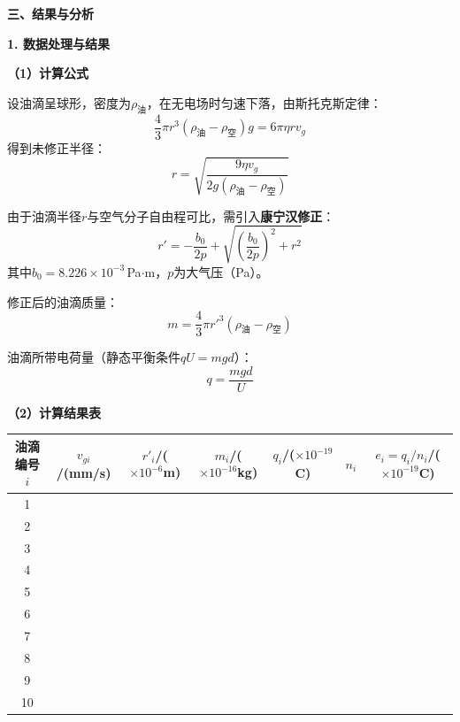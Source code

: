 \documentclass[a4paper,12pt]{article}
\begin{document}
\newpage

{\fontsize{16pt}{24pt}\selectfont \textbf{三、结果与分析}}

\vspace{0.5cm}

{\fontsize{14pt}{20pt}\selectfont \textbf{1. 数据处理与结果}}

\vspace{0.3cm}

{\fontsize{12pt}{18pt}\selectfont

\textbf{（1）计算公式}

设油滴呈球形，密度为$\rho_{\text{油}}$，在无电场时匀速下落，由斯托克斯定律：
\begin{equation}
    \frac{4}{3}\pi r^3(\rho_{\text{油}} - \rho_{\text{空}})g = 6\pi\eta r v_g
\end{equation}
得到未修正半径：
\begin{equation}
    r = \sqrt{\frac{9\eta v_g}{2g(\rho_{\text{油}} - \rho_{\text{空}})}}
\end{equation}

由于油滴半径$r$与空气分子自由程可比，需引入\textbf{康宁汉修正}：
\begin{equation}
    r' = -\frac{b_0}{2p} + \sqrt{\left(\frac{b_0}{2p}\right)^2 + r^2}
\end{equation}
其中$b_0 = 8.226\times10^{-3}$\,Pa$\cdot$m，$p$为大气压（Pa）。

修正后的油滴质量：
\begin{equation}
    m = \frac{4}{3}\pi r'^3(\rho_{\text{油}} - \rho_{\text{空}})
\end{equation}

油滴所带电荷量（静态平衡条件$qU = mgd$）：
\begin{equation}
    q = \frac{mgd}{U}
\end{equation}

\textbf{（2）计算结果表}

}

\vspace{0.3cm}

{\fontsize{9.5pt}{13pt}\selectfont
\begin{tabular}{c|c|c|c|c|c|c}
    \toprule
    油滴编号$i$ & $v_{gi}$/(mm/s) & $r'_i$/($\times10^{-6}$m) & $m_i$/($\times10^{-16}$kg) & $q_i$/($\times10^{-19}$C) & $n_i$ & $e_i = q_i/n_i$/($\times10^{-19}$C) \\
    \midrule
    1  & & & & & & \\[0.6em]
    2  & & & & & & \\[0.6em]
    3  & & & & & & \\[0.6em]
    4  & & & & & & \\[0.6em]
    5  & & & & & & \\[0.6em]
    6  & & & & & & \\[0.6em]
    7  & & & & & & \\[0.6em]
    8  & & & & & & \\[0.6em]
    9  & & & & & & \\[0.6em]
    10 & & & & & & \\[0.6em]
    \bottomrule
\end{tabular}
}
\end{document}
